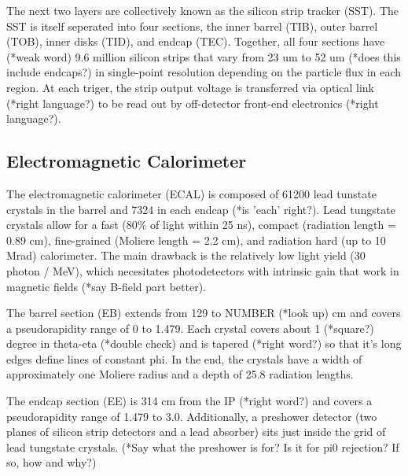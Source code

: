 \documentclass[12pt]{article}
\begin{document}
    The next two layers are collectively known as the silicon strip tracker (SST). The SST is itself seperated into four sections, the inner barrel (TIB), outer barrel (TOB), inner disks (TID), and endcap (TEC). Together, all four sections have (*weak word) 9.6 million silicon strips that vary from 23 um to 52 um (*does this include endcaps?) in single-point resolution depending on the particle flux in each region. At each triger, the strip output voltage is transferred via optical link (*right language?) to be read out by off-detector front-end electronics (*right language?).

\subsection{Electromagnetic Calorimeter}
    The electromagnetic calorimeter (ECAL) is composed of 61200 lead tunstate crystals in the barrel and 7324 in each endcap (*is 'each' right?). Lead tungstate crystals allow for a fast (80\% of light within 25 ns), compact (radiation length = 0.89 cm), fine-grained (Moliere length = 2.2 cm), and radiation hard (up to 10 Mrad) calorimeter. The main drawback is the relatively low light yield (30 photon / MeV), which necesitates photodetectors with intrinsic gain that work in magnetic fields (*say B-field part better). 

    The barrel section (EB) extends from 129 to NUMBER (*look up) cm and covers a pseudorapidity range of 0 to 1.479. Each crystal covers about 1 (*square?) degree in theta-eta (*double check) and is tapered (*right word?) so that it's long edges define lines of constant phi. In the end, the crystals have a width of approximately one Moliere radius and a depth of 25.8 radiation lengths.

    The endcap section (EE) is 314 cm from the IP (*right word?) and covers a pseudorapidity range of 1.479 to 3.0. Additionally, a preshower detector (two planes of silicon strip detectors and a lead absorber) sits just inside the grid of lead tungstate crystals. (*Say what the preshower is for? Is it for pi0 rejection? If so, how and why?)
\end{document}
